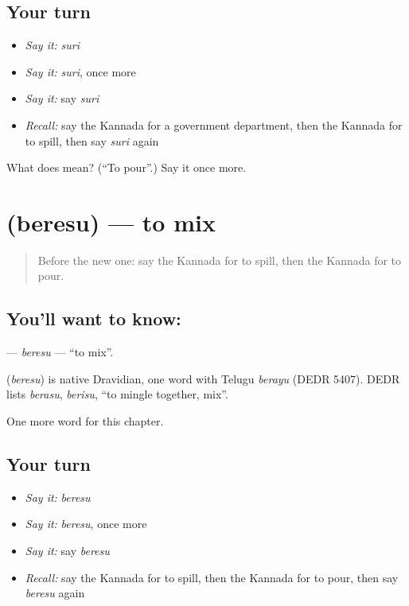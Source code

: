 \subsection*{Your turn}
\begin{itemize}
\raggedright
  \item \emph{Say it:} \emph{suri}
  \item \emph{Say it:} \emph{suri}, once more
  \item \emph{Say it:} say \emph{suri}
  \item \emph{Recall:} say the Kannada for a government department, then the Kannada for to spill, then say \emph{suri} again
\end{itemize}

\begin{tcolorbox}[breakable,colback=teal!4,colframe=teal!35!black,title={Before you move on}]
What does  mean? (\textquotedblleft{}To pour\textquotedblright{}.) Say it once more.
\end{tcolorbox}
\section[\texorpdfstring{\kn{ಬೆರೆಸು} (beresu)}{ಬೆರೆಸು (beresu)}]{ (beresu) — to mix}

\label{lesson:KA-C272-beresu}



\begin{quote}
Before the new one: say the Kannada for to spill, then the Kannada for to pour.
\end{quote}

\subsection*{You'll want to know: }
\textbf{} — \emph{beresu} — \textquotedblleft{}to mix\textquotedblright{}.

\begin{cousinweb}
\textbf{} (\emph{beresu}) is native Dravidian, one word with Telugu \emph{berayu} (DEDR 5407). DEDR lists \emph{berasu}, \emph{berisu}, \textquotedblleft{}to mingle together, mix\textquotedblright{}.
\end{cousinweb}

\begin{grammarlens}[title={What you've built}]
One more word for this chapter.
\end{grammarlens}

\subsection*{Your turn}
\begin{itemize}
\raggedright
  \item \emph{Say it:} \emph{beresu}
  \item \emph{Say it:} \emph{beresu}, once more
  \item \emph{Say it:} say \emph{beresu}
  \item \emph{Recall:} say the Kannada for to spill, then the Kannada for to pour, then say \emph{beresu} again
\end{itemize}

